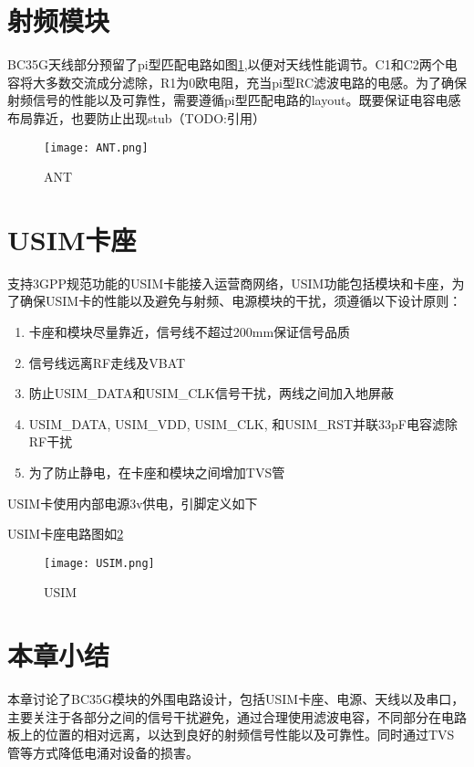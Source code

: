 \section{射频模块}
BC35G天线部分预留了pi型匹配电路如图\ref{ANT},以便对天线性能调节。C1和C2两个电容将大多数交流成分滤除，R1为0欧电阻，充当pi型RC滤波电路的电感。为了确保射频信号的性能以及可靠性，需要遵循pi型匹配电路的layout。既要保证电容电感布局靠近，也要防止出现stub（TODO:引用）
\begin{figure}[H]
	\centering
	\texttt{[image: ANT.png]}
	\caption{ANT}
	\label{ANT}
\end{figure}
\section{USIM卡座}
支持3GPP规范功能的USIM卡能接入运营商网络，USIM功能包括模块和卡座，为了确保USIM卡的性能以及避免与射频、电源模块的干扰，须遵循以下设计原则：

\begin{enumerate}
\item 卡座和模块尽量靠近，信号线不超过200mm保证信号品质
\item 信号线远离RF走线及VBAT
\item 防止USIM\_DATA和USIM\_CLK信号干扰，两线之间加入地屏蔽
\item USIM\_DATA, USIM\_VDD, USIM\_CLK, 和USIM\_RST并联33pF电容滤除RF干扰
\item 为了防止静电，在卡座和模块之间增加TVS管
\end{enumerate}

USIM卡使用内部电源3v供电，引脚定义如下

USIM卡座电路图如\ref{USIM}
\begin{figure}[H]
	\centering
	\texttt{[image: USIM.png]}
	\caption{USIM}
	\label{USIM}
\end{figure}

\section{本章小结}

本章讨论了BC35G模块的外围电路设计，包括USIM卡座、电源、天线以及串口，主要关注于各部分之间的信号干扰避免，通过合理使用滤波电容，不同部分在电路板上的位置的相对远离，以达到良好的射频信号性能以及可靠性。同时通过TVS管等方式降低电涌对设备的损害。